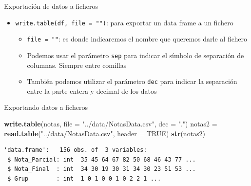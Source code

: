 \documentclass[
  ignorenonframetext,
  aspectratio=169]{beamer}
\newenvironment{Shaded}{\begin{snugshade}}{\end{snugshade}}
\newcommand{\AttributeTok}[1]{\textcolor[rgb]{0.13,0.29,0.53}{#1}}
\newcommand{\ConstantTok}[1]{\textcolor[rgb]{0.56,0.35,0.01}{#1}}
\newcommand{\FunctionTok}[1]{\textcolor[rgb]{0.13,0.29,0.53}{\textbf{#1}}}
\newcommand{\NormalTok}[1]{#1}
\newcommand{\OtherTok}[1]{\textcolor[rgb]{0.56,0.35,0.01}{#1}}
\newcommand{\StringTok}[1]{\textcolor[rgb]{0.31,0.60,0.02}{#1}}
\providecommand{\tightlist}{%
  \setlength{\itemsep}{0pt}\setlength{\parskip}{0pt}}
\begin{document}
\begin{frame}[fragile]{Exportación de datos a ficheros}
\label{exportaciuxf3n-de-datos-a-ficheros}
\begin{itemize}
\tightlist
\item
  \texttt{write.table(df,\ file\ =\ "")}: para exportar un data frame a
  un fichero

  \begin{itemize}
  \tightlist
  \item
    \texttt{file\ =\ ""}: es donde indicaremos el nombre que queremos
    darle al fichero
  \item
    Podemos usar el parámetro \texttt{sep} para indicar el símbolo de
    separación de columnas. Siempre entre comillas
  \item
    También podemos utilizar el parámetro \texttt{dec} para indicar la
    separación entre la parte entera y decimal de los datos
  \end{itemize}
\end{itemize}
\end{frame}

\begin{frame}[fragile]{Exportando datos a ficheros}
\label{exportando-datos-a-ficheros}
\begin{Shaded}
\begin{Highlighting}[]
\FunctionTok{write.table}\NormalTok{(notas, }\AttributeTok{file =} \StringTok{"../data/NotasData.csv"}\NormalTok{,}
            \AttributeTok{dec =} \StringTok{"."}\NormalTok{)}
\NormalTok{notas2 }\OtherTok{=} \FunctionTok{read.table}\NormalTok{(}\StringTok{"../data/NotasData.csv"}\NormalTok{, }\AttributeTok{header =} \ConstantTok{TRUE}\NormalTok{)}
\FunctionTok{str}\NormalTok{(notas2)}
\end{Highlighting}
\end{Shaded}

\begin{verbatim}
'data.frame':   156 obs. of  3 variables:
 $ Nota_Parcial: int  35 45 64 67 82 50 68 46 43 77 ...
 $ Nota_Final  : int  34 30 19 30 31 34 30 23 51 53 ...
 $ Grup        : int  1 0 1 0 0 1 0 2 2 1 ...
\end{verbatim}
\end{frame}
\end{document}
